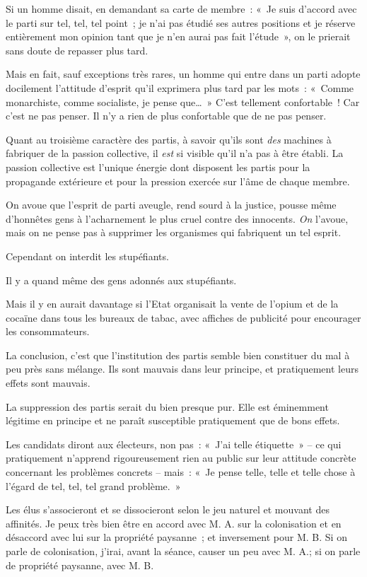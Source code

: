 \documentclass[french,twoside]{book} %
\begin{document}
Si un homme disait, en demandant sa carte de membre : « Je suis d’accord avec le parti sur tel, tel, tel point ; je n’ai pas étudié ses autres positions et je réserve entièrement mon opinion tant que je n’en aurai pas fait l’étude », on le prierait sans doute de repasser plus tard.\par
Mais en fait, sauf exceptions très rares, un homme qui entre dans un parti adopte docilement l’attitude d’esprit qu’il exprimera plus tard par les mots : « Comme monarchiste, comme socialiste, je pense que… » C’est tellement confortable ! Car c’est ne pas penser. Il n’y a rien de plus confortable que de ne pas penser.\par
Quant au troisième caractère des partis, à savoir qu’ils sont \emph{des} machines à fabriquer de la passion collective, il \emph{est} si visible qu’il n’a pas à être établi. La passion collective est l’unique énergie dont disposent les partis pour la propagande extérieure et pour la pression exercée sur l’âme de chaque membre.\par
On avoue que l’esprit de parti aveugle, rend sourd à la justice, pousse même d’honnêtes gens à l’acharnement le plus cruel contre des innocents. \emph{On} l’avoue, mais on ne pense pas à supprimer les organismes qui fabriquent un tel esprit.\par
Cependant on interdit les stupéfiants.\par
Il y a quand même des gens adonnés aux stupéfiants.\par
Mais il y en aurait davantage si l’Etat organisait la vente de l’opium et de la cocaïne dans tous les bureaux de tabac, avec affiches de publicité pour encourager les consommateurs.\par
La conclusion, c’est que l’institution des partis semble bien constituer du mal à peu près sans mélange. Ils sont mauvais dans leur principe, et pratiquement leurs effets sont mauvais.\par
La suppression des partis serait du bien presque pur. Elle est éminemment légitime en principe et ne paraît susceptible pratiquement que de bons effets.\par
Les candidats diront aux électeurs, non pas : « J’ai telle étiquette » – ce qui pratiquement n’apprend rigoureusement rien au public sur leur attitude concrète concernant les problèmes concrets – mais : « Je pense telle, telle et telle chose à l’égard de tel, tel, tel grand problème. »\par
Les élus s’associeront et se dissocieront selon le jeu naturel et mouvant des affinités. Je peux très bien être en accord avec M. A. sur la colonisation et en désaccord avec lui sur la propriété paysanne ; et inversement pour M. B. Si on parle de colonisation, j’irai, avant la séance, causer un peu avec M. A.; si on parle de propriété paysanne, avec M. B.\par
\end{document}
